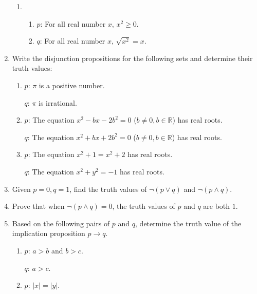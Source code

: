\documentclass{report}
\begin{document}
\begin{enumerate}[leftmargin=*]
\begin{enumerate}[label=(\alph*)]
              \item \begin{enumerate}[label=]
                        \item $p$: For all real number $x$, $x^2 \geq 0$.
                        \item $q$: For all real number $x$, $\sqrt{x^2} = x$.
                    \end{enumerate}
          \end{enumerate}

    \item Write the disjunction propositions for the following sets and determine their
          truth values:
          \begin{enumerate}[label=(\alph*)]
              \item $p$: $\pi$ is a positive number.

                    $q$: $\pi$ is irrational.

              \item $p$: The equation $x^2 - bx - 2b^2 = 0$ ($b \neq 0, b \in \mathbb{R}$) has real roots.

                    $q$: The equation $x^2 + bx + 2b^2 = 0$ ($b \neq 0, b \in \mathbb{R}$) has real roots.

              \item $p$: The equation $x^2 + 1 = x^2 + 2$ has real roots.

                    $q$: The equation $x^2 + y^2 = -1$ has real roots.
          \end{enumerate}

    \item Given $p = 0, q = 1$, find the truth values of $\neg(p \lor q)$ and $\neg(p
              \land q)$.

    \item Prove that when $\neg(p \land q) = 0$, the truth values of $p$ and $q$ are both
          $1$.

    \item Based on the following pairs of $p$ and $q$, determine the truth value of the
          implication proposition $p \rightarrow q$.
          \begin{enumerate}[label=(\alph*)]
              \item $p$: $a > b$ and $b > c$.

                    $q$: $a > c$.

              \item $p$: $|x| = |y|$.


\end{enumerate}
\end{enumerate}
\end{document}
